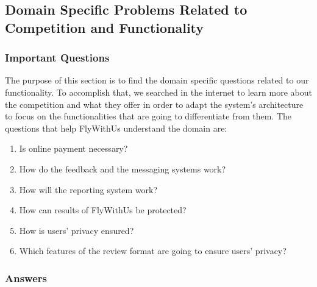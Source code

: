 \subsection{Domain Specific Problems Related to Competition and Functionality}
\subsubsection{Important Questions}
The purpose of this section is to find the domain specific questions related to our functionality. To accomplish that, we searched in the internet to learn more about the competition and what they offer in order to adapt the system's architecture to focus on the functionalities that are going to differentiate from them. The questions that help FlyWithUs understand the domain are:
\begin{enumerate}
\item Is online payment necessary?
\item How do the feedback and the messaging systems work?
\item How will the reporting system work?
\item How can results of FlyWithUs be protected?
\item How is users' privacy ensured?
\item Which features of the review format are going to ensure users' privacy?
\end{enumerate}

\subsubsection{Answers}

